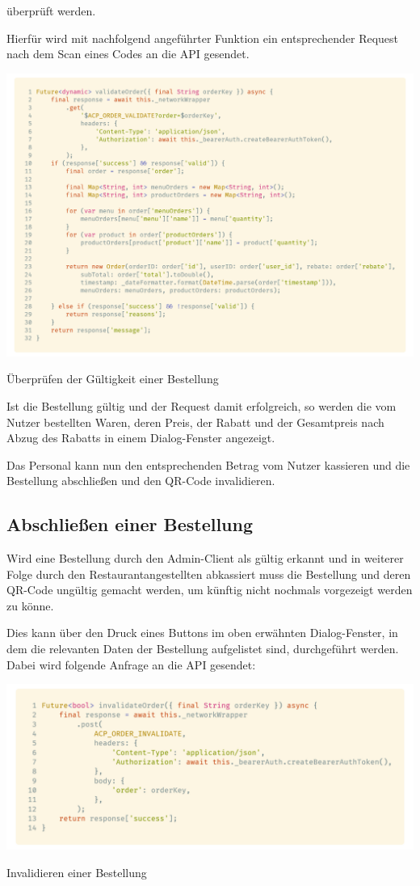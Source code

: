überprüft werden.

Hierfür wird mit nachfolgend angeführter Funktion ein entsprechender Request nach dem Scan eines Codes
an die API gesendet.

\begin{code}[H]
    \centering
    \includegraphics[width=1\textwidth]{images/Admin-Client/services/acpordervalidation/validateOrder.png}
    \vspace{-25pt}
    \caption{Überprüfen der Gültigkeit einer Bestellung}
\end{code}

Ist die Bestellung gültig und der Request damit erfolgreich, so werden die vom Nutzer bestellten
Waren, deren Preis, der Rabatt und der Gesamtpreis nach Abzug des Rabatts in einem Dialog-Fenster
angezeigt.

Das Personal kann nun den entsprechenden Betrag vom Nutzer kassieren und die Bestellung abschließen
und den QR-Code invalidieren.

\subsection{Abschließen einer Bestellung}

Wird eine Bestellung durch den Admin-Client als gültig erkannt und in weiterer Folge durch den
Restaurantangestellten abkassiert muss die Bestellung und deren QR-Code ungültig gemacht werden,
um künftig nicht nochmals vorgezeigt werden zu könne.

Dies kann über den Druck eines Buttons im oben erwähnten Dialog-Fenster, in dem die relevanten Daten
der Bestellung aufgelistet sind, durchgeführt werden.\\
Dabei wird folgende Anfrage an die API gesendet:

\begin{code}[H]
    \centering
    \includegraphics[width=1\textwidth]{images/Admin-Client/services/acpordervalidation/invalidateOrder.png}
    \vspace{-25pt}
    \caption{Invalidieren einer Bestellung}
\end{code}

